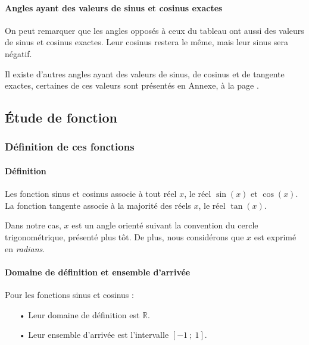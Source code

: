 \documentclass[a4paper]{article}
\begin{document}
			\paragraph*{Angles ayant des valeurs de sinus et cosinus exactes}
			\phantom{r}

			On peut remarquer que les angles opposés à ceux du tableau ont aussi 
			des valeurs de sinus et cosinus exactes.
			Leur cosinus restera le même, mais leur sinus sera négatif. 
			
			Il existe d'autres angles ayant des valeurs de sinus, de cosinus et de tangente exactes,
			certaines de ces valeurs sont présentés en Annexe, à la page \pageref{valeur_remarquable_trigo}.

		\subsection{Étude de fonction}
			\subsubsection{Définition de ces fonctions}
				\paragraph*{Définition}
					\phantom{r}

					Les fonction sinus et cosinus associe à tout réel $x$, le réel $\sin(x)$ et $\cos(x)$.
					La fonction tangente associe à la majorité des réels $x$, le réel $\tan(x)$.				
					
					Dans notre cas, $x$ est un angle orienté suivant la convention du cercle trigonométrique, présenté plus tôt.
					De plus, nous considérons que $x$ est exprimé en \emph{radians}.

				\paragraph*{Domaine de définition et ensemble d'arrivée}
					\phantom{r}

					Pour les fonctions sinus et cosinus :
					\begin{itemize}
						\item [•] Leur domaine de définition est $\mathbb{R}$.
						\item [•] Leur ensemble d'arrivée est l'intervalle $[-1~;~1]$.
					\end{itemize}

					\vspace{2mm}
\end{document}
